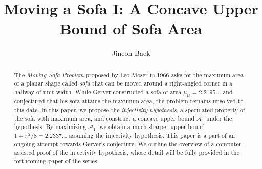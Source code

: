 \documentclass[a4paper]{amsart}
\title[Moving a Sofa I: A Concave Upper Bound of Sofa Area]{Moving a Sofa I: A Concave Upper Bound of Sofa Area}
\author{Jineon Baek}
\theoremstyle{plain}
\theoremstyle{definition}
\begin{document}
\maketitle

\begin{abstract}
The \emph{Moving Sofa Problem} proposed by Leo Moser in 1966 asks for the maximum area of a planar shape called \emph{sofa} that can be moved around a right-angled corner in a hallway of unit width.
While Gerver constructed a sofa of area $\mu_G = 2.2195\dots$ and conjectured that his sofa attains the maximum area, the problem remains unsolved to this date.
In this paper, we propose the \emph{injectivity hypothesis}, a speculated property of the sofa with maximum area, and construct a concave upper bound $\mathcal{A}_1$ under the hypothesis.
By maximizing $\mathcal{A}_1$, we obtain a much sharper upper bound $1 + \pi^2/8 = 2.2337\dots$ assuming the injectivity hypothesis.
This paper is a part of an ongoing attempt towards Gerver's conjecture.
We outline the overview of a computer-assisted proof of the injectivity hypothesis, whose detail will be fully provided in the forthcoming paper of the series.
\end{abstract}



\printbibliography
\end{document}
